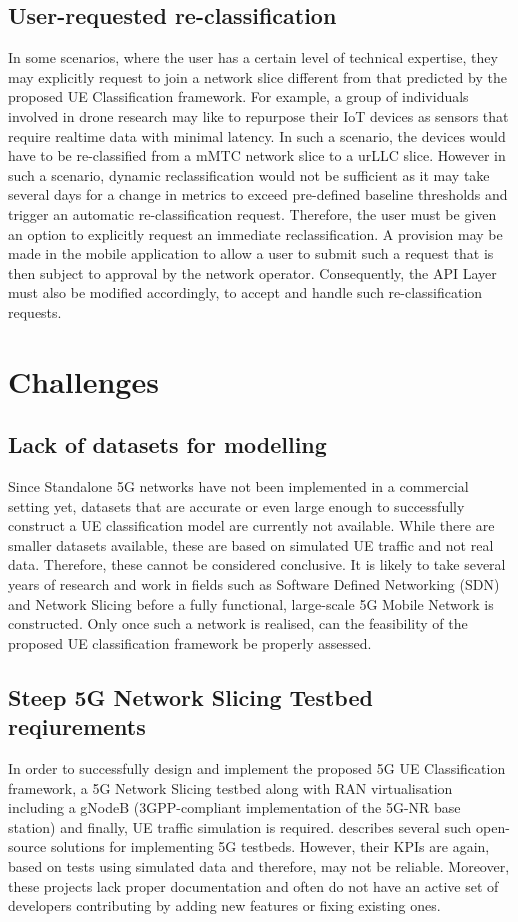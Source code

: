 \documentclass[conference]{IEEEtran}
\begin{document}
\subsection{User-requested re-classification}
In some scenarios, where the user has a certain level of technical expertise, they may explicitly request to join a network slice different from that predicted by the proposed UE Classification framework. For example, a group of individuals involved in drone research may like to repurpose their IoT devices as sensors that require realtime data with minimal latency. In such a scenario, the devices would have to be re-classified from a mMTC network slice to a urLLC slice. However in such a scenario, dynamic reclassification would not be sufficient as it may take several days for a change in metrics to exceed pre-defined baseline thresholds and trigger an automatic re-classification request. Therefore, the user must be given an option to explicitly request an immediate reclassification. A provision may be made in the mobile application to allow a user to submit such a request that is then subject to approval by the network operator. Consequently, the API Layer must also be modified accordingly, to accept and handle such re-classification requests.

\section{Challenges}
\subsection{Lack of datasets for modelling}
Since Standalone 5G networks have not been implemented in a commercial setting yet, datasets that are accurate or even large enough to successfully construct a UE classification model are currently not available. While there are smaller datasets available, these are based on simulated UE traffic and not real data. Therefore, these cannot be considered conclusive. It is likely to take several years of research and work in fields such as Software Defined Networking (SDN) and Network Slicing before a fully functional, large-scale 5G Mobile Network is constructed. Only once such a network is realised, can the feasibility of the proposed UE classification framework be properly assessed.

\subsection{Steep 5G Network Slicing Testbed reqiurements}
In order to successfully design and implement the proposed 5G UE Classification framework, a 5G Network Slicing testbed along with RAN virtualisation including a gNodeB (3GPP-compliant implementation of the 5G-NR base station) and finally, UE traffic simulation is required. \cite{b1} describes several such open-source solutions for implementing 5G testbeds. However, their KPIs are again, based on tests using simulated data and therefore, may not be reliable. Moreover, these projects lack proper documentation and often do not have an active set of developers contributing by adding new features or fixing existing ones.
\end{document}
